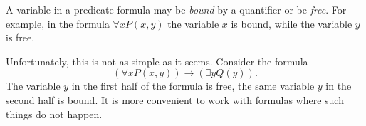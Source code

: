 

\setcounter{section}{1}
\setcounter{subsection}{2}
\setcounter{dfn}{4}

A variable in a predicate formula may be \emph{bound} by a quantifier or be \emph{free}.
For example, in the formula $\forall x P(x,y)$ the variable $x$ is bound, while the variable $y$ is free.

Unfortunately, this is not as simple as it seems.
Consider the formula
\[
(\forall x P(x,y)) \to (\exists y Q(y)).
\]
The variable $y$ in the first half of the formula is free, the same variable $y$ in the second half is bound.
It is more convenient to work with formulas where such things do not happen.




